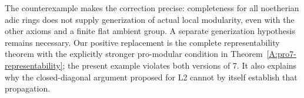 The counterexample makes the correction precise: completeness for
all noetherian adic rings does not supply generization of actual
local modularity, even with the other axioms and a finite flat
ambient group. A separate generization hypothesis remains necessary.
Our positive replacement is the complete representability theorem
with the explicitly stronger pro-modular condition in
Theorem~\ref{A:pro7-representability}; the present example violates
both versions of 7. It also explains why the closed-diagonal
argument proposed for L2 cannot by itself establish that propagation.
